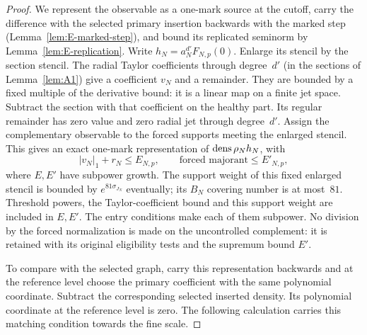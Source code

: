 \begin{proof}
We represent the observable as a one-mark source at the cutoff, carry the difference with the selected primary insertion backwards with the marked step (Lemma~\ref{lem:E-marked-step}), and bound its replicated seminorm by Lemma~\ref{lem:E-replication}. Write $h_N=a_N^{d'}F_{N,p}(0)$. Enlarge its stencil by the section stencil. The radial Taylor coefficients through degree~$d'$ (in the sections of Lemma~\ref{lem:A1}) give a coefficient $v_N$ and a remainder. They are bounded by a fixed multiple of the derivative bound: it is a linear map on a finite jet space. Subtract the section with that coefficient on the healthy part. Its regular remainder has zero value and zero radial jet through degree~$d'$. Assign the complementary observable to the forced supports meeting the enlarged stencil. This gives an exact one-mark representation of $\operatorname{dens}\rho_N h_N$, with
\begin{equation}\label{eq:E-local-start}
 |v_N|_1+r_N\le E_{N,p},\qquad
 \text{forced majorant}\le E'_{N,p},
\end{equation}
where $E,E'$ have subpower growth. The support weight of this fixed enlarged stencil is bounded by $e^{81\sigma_{J_N}}$ eventually; its $B_N$ covering number is at most~$81$. Threshold powers, the Taylor-coefficient bound and this support weight are included in $E,E'$. The entry conditions make each of them subpower. No division by the forced normalization is made on the uncontrolled complement: it is retained with its original eligibility tests and the supremum bound $E'$.

To compare with the selected graph, carry this representation backwards and at the reference level choose the primary coefficient with the same polynomial coordinate. Subtract the corresponding selected inserted density. Its polynomial coordinate at the reference level is zero. The following calculation carries this matching condition towards the fine scale.


\end{proof}
